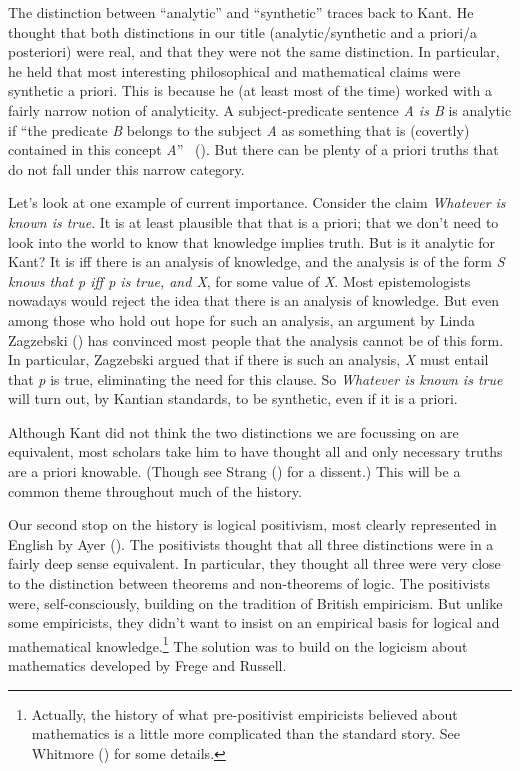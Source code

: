 \documentclass[
  11pt,
  letterpaper,
  DIV=11,
  numbers=noendperiod,
  twoside]{scrartcl}
\begin{document}
The distinction between ``analytic'' and ``synthetic'' traces back to
Kant. He thought that both distinctions in our title (analytic/synthetic
and a priori/a posteriori) were real, and that they were not the same
distinction. In particular, he held that most interesting philosophical
and mathematical claims were synthetic a priori. This is because he (at
least most of the time) worked with a fairly narrow notion of
analyticity. A subject-predicate sentence \emph{A is B} is analytic if
``the predicate \emph{B} belongs to the subject \emph{A} as something
that is (covertly) contained in this concept \emph{A}''
~(). But there
can be plenty of a priori truths that do not fall under this narrow
category.

Let's look at one example of current importance. Consider the claim
\emph{Whatever is known is true}. It is at least plausible that that is
a priori; that we don't need to look into the world to know that
knowledge implies truth. But is it analytic for Kant? It is iff there is
an analysis of knowledge, and the analysis is of the form \emph{S knows
that p iff p is true, and X}, for some value of \emph{X}. Most
epistemologists nowadays would reject the idea that there is an analysis
of knowledge. But even among those who hold out hope for such an
analysis, an argument by Linda Zagzebski
() has convinced most people that the
analysis cannot be of this form. In particular, Zagzebski argued that if
there is such an analysis, \emph{X} must entail that \emph{p} is true,
eliminating the need for this clause. So \emph{Whatever is known is
true} will turn out, by Kantian standards, to be synthetic, even if it
is a priori.

Although Kant did not think the two distinctions we are focussing on are
equivalent, most scholars take him to have thought all and only
necessary truths are a priori knowable. (Though see Strang
() for a dissent.) This will be a common
theme throughout much of the history.

Our second stop on the history is logical positivism, most clearly
represented in English by Ayer (). The
positivists thought that all three distinctions were in a fairly deep
sense equivalent. In particular, they thought all three were very close
to the distinction between theorems and non-theorems of logic. The
positivists were, self-consciously, building on the tradition of British
empiricism. But unlike some empiricists, they didn't want to insist on
an empirical basis for logical and mathematical knowledge.\footnote{Actually,
  the history of what pre-positivist empiricists believed about
  mathematics is a little more complicated than the standard story. See
  Whitmore () for some details.} The
solution was to build on the logicism about mathematics developed by
Frege and Russell.
\end{document}
